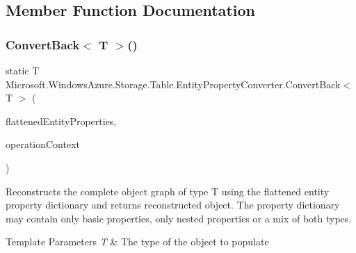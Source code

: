 \subsection{Member Function Documentation}
\mbox{\label{classMicrosoft_1_1WindowsAzure_1_1Storage_1_1Table_1_1EntityPropertyConverter_afb4edd95dfd79d576091119b5ac13ad7}} 
\subsubsection{\texorpdfstring{Convert\+Back$<$ T $>$()}{ConvertBack< T >()}\hspace{0.1cm}{\footnotesize\ttfamily [1/2]}}
{\footnotesize\ttfamily static T Microsoft.\+Windows\+Azure.\+Storage.\+Table.\+Entity\+Property\+Converter.\+Convert\+Back$<$ T $>$ (\begin{DoxyParamCaption}\item[{I\+Dictionary$<$ string, Entity\+Property $>$}]{flattened\+Entity\+Properties,  }\item[{Operation\+Context}]{operation\+Context }\end{DoxyParamCaption})\hspace{0.3cm}{\ttfamily [static]}}



Reconstructs the complete object graph of type T using the flattened entity property dictionary and returns reconstructed object. The property dictionary may contain only basic properties, only nested properties or a mix of both types. 


\begin{DoxyTemplParams}{Template Parameters}
{\em T} & The type of the object to populate\\
\hline
\end{DoxyTemplParams}

